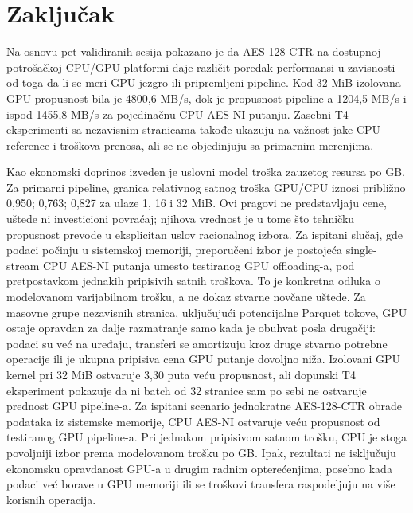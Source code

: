 \documentclass[11pt,b5paper]{article}
\begin{document}
\section{Zaključak}
Na osnovu pet validiranih sesija pokazano je da AES-128-CTR na dostupnoj potrošačkoj CPU/GPU platformi daje različit poredak performansi u zavisnosti od toga da li se meri GPU jezgro ili pripremljeni pipeline. Kod 32 MiB izolovana GPU propusnost bila je 4800,6 MB/s, dok je propusnost pipeline-a 1204,5 MB/s i ispod 1455,8 MB/s za pojedinačnu CPU AES-NI putanju. Zasebni T4 eksperimenti sa nezavisnim stranicama takođe ukazuju na važnost jake CPU reference i troškova prenosa, ali se ne objedinjuju sa primarnim merenjima.\par
Kao ekonomski doprinos izveden je uslovni model troška zauzetog resursa po GB. Za primarni pipeline, granica relativnog satnog troška GPU/CPU iznosi približno 0,950; 0,763; 0,827 za ulaze 1, 16 i 32 MiB. Ovi pragovi ne predstavljaju cene, uštede ni investicioni povraćaj; njihova vrednost je u tome što tehničku propusnost prevode u eksplicitan uslov racionalnog izbora. Za ispitani slučaj, gde podaci počinju u sistemskoj memoriji, preporučeni izbor je postojeća single-stream CPU AES-NI putanja umesto testiranog GPU offloading-a, pod pretpostavkom jednakih pripisivih satnih troškova. To je konkretna odluka o modelovanom varijabilnom trošku, a ne dokaz stvarne novčane uštede. Za masovne grupe nezavisnih stranica, uključujući potencijalne Parquet tokove, GPU ostaje opravdan za dalje razmatranje samo kada je obuhvat posla drugačiji: podaci su već na uređaju, transferi se amortizuju kroz druge stvarno potrebne operacije ili je ukupna pripisiva cena GPU putanje dovoljno niža. Izolovani GPU kernel pri 32 MiB ostvaruje 3,30 puta veću propusnost, ali dopunski T4 eksperiment pokazuje da ni batch od 32 stranice sam po sebi ne ostvaruje prednost GPU pipeline-a. Za ispitani scenario jednokratne AES-128-CTR obrade podataka iz sistemske memorije, CPU AES-NI ostvaruje veću propusnost od testiranog GPU pipeline-a. Pri jednakom pripisivom satnom trošku, CPU je stoga povoljniji izbor prema modelovanom trošku po GB. Ipak, rezultati ne isključuju ekonomsku opravdanost GPU-a u drugim radnim opterećenjima, posebno kada podaci već borave u GPU memoriji ili se troškovi transfera raspodeljuju na više korisnih operacija.

\begingroup\fontsize{9}{11}\selectfont\sloppy
\printbibliography[title={Literatura}]
\endgroup
\end{document}
